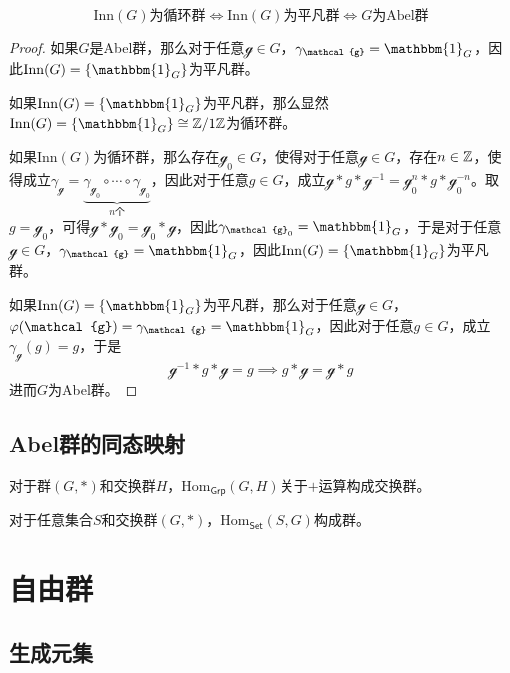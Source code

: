 \begin{proposition}
	$$
	\mathrm{Inn}(G)\text{为循环群}
	\iff
	\mathrm{Inn}(G)\text{为平凡群}
	\iff
	G\text{为Abel群}
	$$
\end{proposition}

\begin{proof}
	如果$G$是Abel群，那么对于任意$\mathcal{g}\in G$，$\gamma_\mathcal{g}=\mathbbm{1}_G$，因此$\mathrm{Inn}(G)=\{ \mathbbm{1}_G \}$为平凡群。
	
	如果$\mathrm{Inn}(G)=\{ \mathbbm{1}_G \}$为平凡群，那么显然$\mathrm{Inn}(G)=\{ \mathbbm{1}_G \}\cong\Z/1\Z$为循环群。
	
	如果$\mathrm{Inn}(G)$为循环群，那么存在$\mathcal{g}_0\in G$，使得对于任意$\mathcal{g}\in G$，存在$n\in\mathbb{Z}$，使得成立$\gamma_\mathcal{g}=\underbrace{\gamma_{\mathcal{g}_0}\circ\cdots\circ\gamma_{\mathcal{g}_0}}_{n\text{个}}$，因此对于任意$g\in G$，成立$\mathcal{g}*g*\mathcal{g}^{-1}=\mathcal{g}_0^n*g*\mathcal{g}_0^{-n}$。取$g=\mathcal{g}_0$，可得$\mathcal{g}*\mathcal{g}_0=\mathcal{g}_0*\mathcal{g}$，因此$\gamma_{\mathcal{g}_0}=\mathbbm{1}_G$，于是对于任意$\mathcal{g}\in G$，$\gamma_{\mathcal{g}}=\mathbbm{1}_G$，因此$\mathrm{Inn}(G)=\{ \mathbbm{1}_G \}$为平凡群。
	
	如果$\mathrm{Inn}(G)=\{ \mathbbm{1}_G \}$为平凡群，那么对于任意$\mathcal{g}\in G$，$\varphi(\mathcal{g})=\gamma_{\mathcal{g}}=\mathbbm{1}_G$，因此对于任意$g\in G$，成立$\gamma_{\mathcal{g}}(g)=g$，于是
	$$
	\mathcal{g}^{-1}*g*\mathcal{g}=g\implies g*\mathcal{g}=\mathcal{g}*g
	$$
	进而$G$为Abel群。
\end{proof}

\subsection{Abel群的同态映射}

\begin{proposition}
	对于群$(G,*)$和交换群$H$，$\mathrm{Hom}_{\mathsf{Grp}}(G,H)$关于$+$运算构成交换群。
\end{proposition}

\begin{proposition}
	对于任意集合$S$和交换群$(G,*)$，$\mathrm{Hom}_{\mathsf{Set}}(S,G)$构成群。
\end{proposition}

\section{自由群}

\subsection{生成元集}

